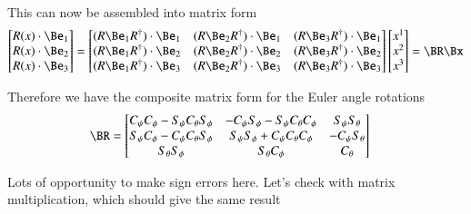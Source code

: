 \documentclass{article}
\begin{document}
This can now be assembled into matrix form
\begin{align*}
\begin{bmatrix}
R(x) \cdot \Be_1 \\
R(x) \cdot \Be_2 \\
R(x) \cdot \Be_3
\end{bmatrix}
=
\begin{bmatrix}
(R \Be_1 R^\dagger) \cdot \Be_1 & (R \Be_2 R^\dagger) \cdot \Be_1 & (R \Be_3 R^\dagger) \cdot \Be_1 \\
(R \Be_1 R^\dagger) \cdot \Be_2 & (R \Be_2 R^\dagger) \cdot \Be_2 & (R \Be_3 R^\dagger) \cdot \Be_2 \\
(R \Be_1 R^\dagger) \cdot \Be_3 & (R \Be_2 R^\dagger) \cdot \Be_3 & (R \Be_3 R^\dagger) \cdot \Be_3 \\
\end{bmatrix}
\begin{bmatrix}
x^1 \\
x^2 \\
x^3 \\
\end{bmatrix} = \BR \Bx
\end{align*}

Therefore we have the composite matrix form for the Euler angle rotations
\begin{align*}
\BR &=
\begin{bmatrix}
C_\psi C_\phi - S_\psi C_\theta S_\phi & - C_\psi S_\phi - S_\psi C_\theta C_\phi & S_\psi S_\theta \\
S_\psi C_\phi - C_\psi C_\theta S_\phi &  S_\psi S_\phi + C_\psi C_\theta C_\phi & -C_\psi S_\theta \\
S_\theta S_\phi & S_\theta C_\phi & C_\theta \\
\end{bmatrix}
\end{align*}

Lots of opportunity to make sign errors here.  Let's check with matrix multiplication, which should give the same result
\end{document}
